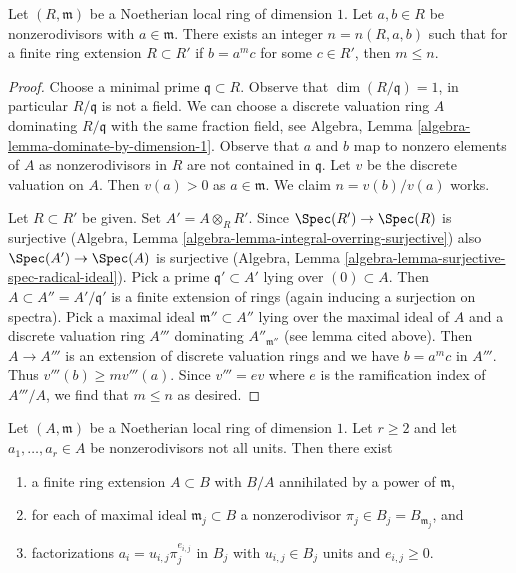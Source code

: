 \begin{lemma}
\label{lemma-not-infinitely-divisible}
Let $(R, \mathfrak m)$ be a Noetherian local ring of dimension $1$.
Let $a, b \in R$ be nonzerodivisors with $a \in \mathfrak m$.
There exists an integer $n = n(R, a, b)$ such that for a finite ring
extension $R \subset R'$ if $b = a^m c$ for some $c \in R'$, then $m \leq n$.
\end{lemma}

\begin{proof}
Choose a minimal prime $\mathfrak q \subset R$. Observe that
$\dim(R/\mathfrak q) = 1$, in particular $R/\mathfrak q$ is not a field.
We can choose a discrete valuation ring $A$ dominating $R/\mathfrak q$
with the same fraction field, see
Algebra, Lemma \ref{algebra-lemma-dominate-by-dimension-1}. Observe that
$a$ and $b$ map to nonzero elements of $A$ as nonzerodivisors in $R$
are not contained in $\mathfrak q$. Let $v$ be the discrete valuation on $A$.
Then $v(a) > 0$ as $a \in \mathfrak m$.
We claim $n = v(b)/v(a)$ works.

\medskip\noindent
Let $R \subset R'$ be given. Set $A' = A \otimes_R R'$.
Since $\Spec(R') \to \Spec(R)$ is surjective
(Algebra, Lemma \ref{algebra-lemma-integral-overring-surjective})
also $\Spec(A') \to \Spec(A)$ is surjective
(Algebra, Lemma \ref{algebra-lemma-surjective-spec-radical-ideal}).
Pick a prime $\mathfrak q' \subset A'$ lying over $(0) \subset A$.
Then $A \subset A'' = A'/\mathfrak q'$ is a finite extension of rings
(again inducing a surjection on spectra).
Pick a maximal ideal $\mathfrak m'' \subset A''$
lying over the maximal ideal of $A$ and a discrete valuation ring
$A'''$ dominating $A''_{\mathfrak m''}$ (see lemma cited above).
Then $A \to A'''$ is an extension of discrete valuation rings
and we have $b = a^m c$ in $A'''$. Thus $v'''(b) \geq mv'''(a)$.
Since $v''' = ev$ where $e$ is the ramification index
of $A'''/A$, we find that $m \leq n$ as desired.
\end{proof}

\begin{lemma}
\label{lemma-prepare-tame-symbol}
Let $(A, \mathfrak m)$ be a Noetherian local ring of dimension $1$.
Let $r \geq 2$ and let $a_1, \ldots, a_r \in A$ be nonzerodivisors
not all units.
Then there exist
\begin{enumerate}
\item a finite ring extension $A \subset B$ with
$B/A$ annihilated by a power of $\mathfrak m$,
\item for each of maximal ideal $\mathfrak m_j \subset B$
a nonzerodivisor $\pi_j \in B_j = B_{\mathfrak m_j}$, and
\item factorizations $a_i = u_{i, j} \pi_j^{e_{i, j}}$ in $B_j$
with $u_{i, j} \in B_j$ units and $e_{i, j} \geq 0$.
\end{enumerate}
\end{lemma}

